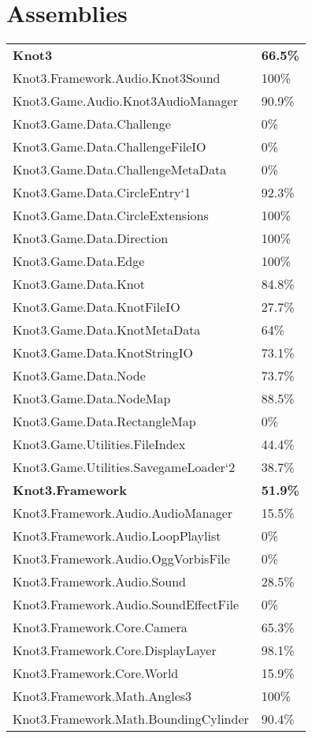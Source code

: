 \documentclass[a4paper,10pt]{article}
\begin{document}
\section{Assemblies}
\begin{longtable}[l]{ll}
\textbf{Knot3} & \textbf{66.5\%}\\
Knot3.Framework.Audio.Knot3Sound & 100\%\\
Knot3.Game.Audio.Knot3AudioManager & 90.9\%\\
Knot3.Game.Data.Challenge & 0\%\\
Knot3.Game.Data.ChallengeFileIO & 0\%\\
Knot3.Game.Data.ChallengeMetaData & 0\%\\
Knot3.Game.Data.CircleEntry`1 & 92.3\%\\
Knot3.Game.Data.CircleExtensions & 100\%\\
Knot3.Game.Data.Direction & 100\%\\
Knot3.Game.Data.Edge & 100\%\\
Knot3.Game.Data.Knot & 84.8\%\\
Knot3.Game.Data.KnotFileIO & 27.7\%\\
Knot3.Game.Data.KnotMetaData & 64\%\\
Knot3.Game.Data.KnotStringIO & 73.1\%\\
Knot3.Game.Data.Node & 73.7\%\\
Knot3.Game.Data.NodeMap & 88.5\%\\
Knot3.Game.Data.RectangleMap & 0\%\\
Knot3.Game.Utilities.FileIndex & 44.4\%\\
Knot3.Game.Utilities.SavegameLoader`2 & 38.7\%\\
\textbf{Knot3.Framework} & \textbf{51.9\%}\\
Knot3.Framework.Audio.AudioManager & 15.5\%\\
Knot3.Framework.Audio.LoopPlaylist & 0\%\\
Knot3.Framework.Audio.OggVorbisFile & 0\%\\
Knot3.Framework.Audio.Sound & 28.5\%\\
Knot3.Framework.Audio.SoundEffectFile & 0\%\\
Knot3.Framework.Core.Camera & 65.3\%\\
Knot3.Framework.Core.DisplayLayer & 98.1\%\\
Knot3.Framework.Core.World & 15.9\%\\
Knot3.Framework.Math.Angles3 & 100\%\\
Knot3.Framework.Math.BoundingCylinder & 90.4\%\\

\end{longtable}
\end{document}
